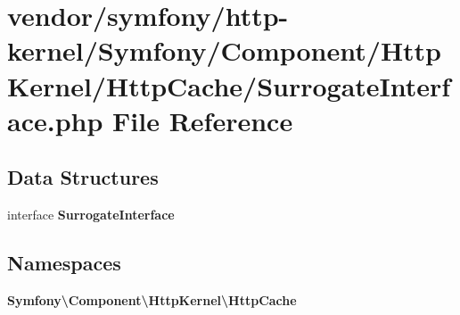 \section{vendor/symfony/http-\/kernel/\+Symfony/\+Component/\+Http\+Kernel/\+Http\+Cache/\+Surrogate\+Interface.php File Reference}
\label{_surrogate_interface_8php}
\subsection*{Data Structures}
\begin{DoxyCompactItemize}
\item 
interface {\bf Surrogate\+Interface}
\end{DoxyCompactItemize}
\subsection*{Namespaces}
\begin{DoxyCompactItemize}
\item 
 {\bf Symfony\textbackslash{}\+Component\textbackslash{}\+Http\+Kernel\textbackslash{}\+Http\+Cache}
\end{DoxyCompactItemize}
